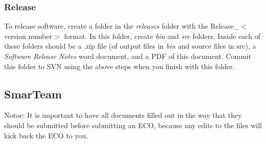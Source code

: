 \documentclass[10pt]{article}
\begin{document}
            \subsubsection{Release}
                To release software, create a folder in the \emph{releases} folder with the Release\_$<$version number$>$ format. In this folder, create \emph{bin} and \emph{src} folders. Inside each of these folders should be a .zip file (of output files in \emph{bin} and source files in {src}), a \emph{Software Release Notes} word document, and a PDF of this document. Commit this folder to SVN using the above steps when you finish with this folder.
        \subsection{SmarTeam}
            Notoe: It is important to have all documents filled out in the way that they should be submitted before submitting an ECO, because any edits to the files will kick back the ECO to you.
\end{document}
